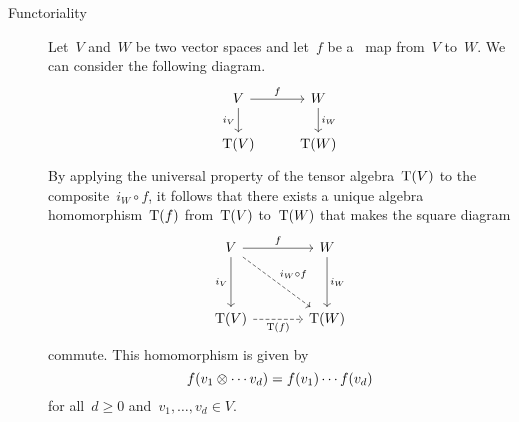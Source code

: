 \begin{recall}
\begin{description}
		\item[Functoriality]
			Let~$V$ and~$W$ be two vector spaces and let~$f$ be a~\linear{$\kf$} map from~$V$ to~$W$.
			We can consider the following diagram.
			\[
				\begin{tikzcd}
					V
					\arrow{r}[above]{f}
					\arrow{d}[left]{i_V}
					&
					W
					\arrow{d}[right]{i_W}
					\\
					\Tensor(V)
					&
					\Tensor(W)
				\end{tikzcd}
			\]
			By applying the universal property of the tensor algebra~$\operatorname{T}(V)$ to the composite~$i_W \circ f$, it follows that there exists a unique algebra homomorphism~$\operatorname{T}(f)$ from~$\operatorname{T}(V)$ to~$\operatorname{T}(W)$ that makes the square diagram
			\[
				\begin{tikzcd}[column sep = large, row sep = huge]
					V
					\arrow{r}[above]{f}
					\arrow{d}[left]{i_V}
					\arrow[dashed]{dr}[above right]{i_W \circ f}
					&
					W
					\arrow{d}[right]{i_W}
					\\
					\Tensor(V)
					\arrow[dashed]{r}[below]{\Tensor(f)}
					&
					\Tensor(W)
				\end{tikzcd}
			\]
			commute.
			This homomorphism is given by
			\[
				f(v_1 \otimes \dotsb v_d)
				=
				f(v_1) \dotsm f(v_d)
			\]
			for all~$d \geq 0$ and~$v_1, \dotsc, v_d \in V$.


\end{description}
\end{recall}
